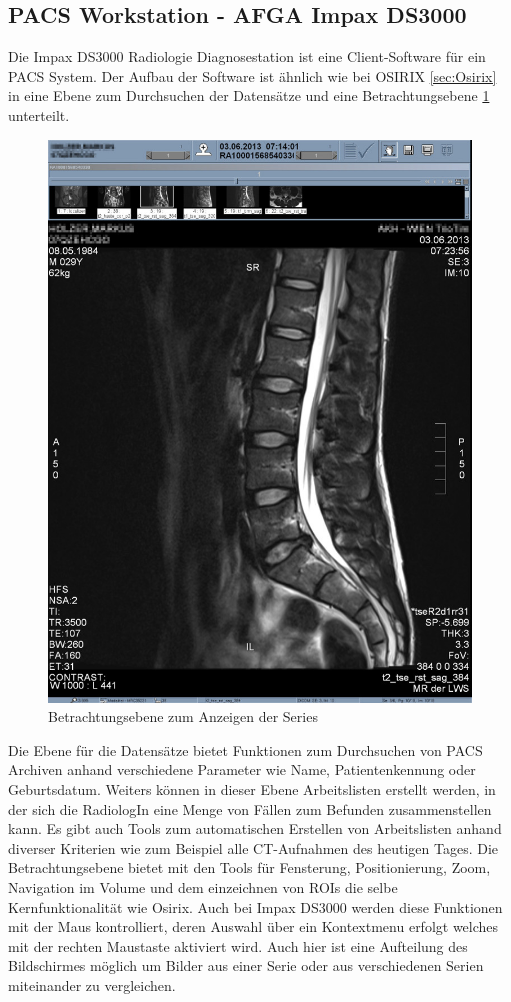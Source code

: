 \subsection{PACS Workstation - AFGA Impax DS3000}
\label{sec:PACS_Workstation}
Die Impax DS3000 Radiologie Diagnosestation ist eine Client-Software für ein PACS System.
Der Aufbau der Software ist ähnlich wie bei OSIRIX \ref{sec:Osirix} in eine Ebene zum Durchsuchen der Datensätze und eine Betrachtungsebene \ref{fig:impacs_2d_view} unterteilt.
%
\begin{figure}[t]
	\centering
	\includegraphics[width=0.5\linewidth]{img/c2_impacs_2d_view.jpg}
	\caption{Betrachtungsebene zum Anzeigen der Series}
	\label{fig:impacs_2d_view}
\end{figure}
%
Die Ebene für die Datensätze bietet Funktionen zum Durchsuchen von PACS Archiven anhand verschiedene Parameter wie Name, Patientenkennung oder Geburtsdatum.
Weiters können in dieser Ebene Arbeitslisten erstellt werden, in der sich die RadiologIn eine Menge von Fällen zum Befunden zusammenstellen kann.
Es gibt auch Tools zum automatischen Erstellen von Arbeitslisten anhand diverser Kriterien wie zum Beispiel alle CT-Aufnahmen des heutigen Tages.
%
Die Betrachtungsebene bietet mit den Tools für Fensterung, Positionierung, Zoom, Navigation im Volume und dem einzeichnen von ROIs die selbe Kernfunktionalität wie Osirix.
Auch bei Impax DS3000 werden diese Funktionen mit der Maus kontrolliert, deren Auswahl über ein Kontextmenu erfolgt welches mit der rechten Maustaste aktiviert wird.
Auch hier ist eine Aufteilung des Bildschirmes möglich um Bilder aus einer Serie oder aus verschiedenen Serien miteinander zu vergleichen.

